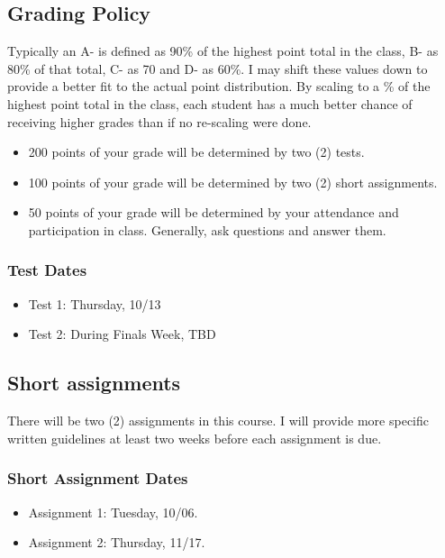 \documentclass[11pt,]{article}
\providecommand{\tightlist}{%
  \setlength{\itemsep}{0pt}\setlength{\parskip}{0pt}}
\begin{document}
\subsection{Grading Policy}\label{grading-policy-1}

Typically an A- is defined as 90\% of the highest point total in the
class, B- as 80\% of that total, C- as 70 and D- as 60\%. I may shift
these values down to provide a better fit to the actual point
distribution. By scaling to a \% of the highest point total in the
class, each student has a much better chance of receiving higher grades
than if no re-scaling were done.

\begin{itemize}
\tightlist
\item
  200 points of your grade will be determined by two (2) tests.
\item
  100 points of your grade will be determined by two (2) short
  assignments.
\item
  50 points of your grade will be determined by your attendance and
  participation in class. Generally, ask questions and answer them.
\end{itemize}

\subsubsection{Test Dates}\label{test-dates-1}

\begin{itemize}
\item
  Test 1: Thursday, 10/13
\item
  Test 2: During Finals Week, TBD
\end{itemize}

\subsection{Short assignments}\label{short-assignments-1}

There will be two (2) assignments in this course. I will provide more
specific written guidelines at least two weeks before each assignment is
due.

\subsubsection{Short Assignment Dates}\label{short-assignment-dates}

\begin{itemize}
\item
  Assignment 1: Tuesday, 10/06.
\item
  Assignment 2: Thursday, 11/17.
\end{itemize}
\end{document}
